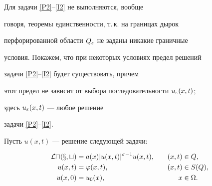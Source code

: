 Для задачи \eqref{P2}--\eqref{I2} не выполняются, вообще


говоря, теоремы единственности, т.\,к. на границах дырок


перфорированной области $Q_\varepsilon$ не заданы никакие граничные


условия. Покажем, что при некоторых условиях предел решений


задачи \eqref{P2}--\eqref{I2} будет существовать, причем


этот предел не зависит от выбора последовательности $u_\varepsilon(x,t)$;


здесь $u_\varepsilon(x,t)$ --- любое решение


задачи \eqref{P2}--\eqref{I2}.





Пусть $u(x,t)$ --- решение следующей задачи:


\begin{alignat}{2}


\cal{L}u(x,t)&=a(x)|u(x,t)|^{\sigma-1}u(x,t), &\quad (x,t)&\in Q, \label{P1}\\


u(x,t)&=\varphi(x,t), &\quad (x,t)&\in S(Q),\label{B1}\\


u(x,0)&=u_0(x), &\quad x&\in\Omega. \label{I1}


\end{alignat}








